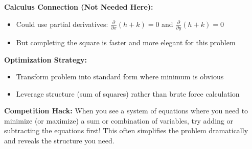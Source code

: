 \documentclass[12pt]{article}
\begin{document}
\begin{tacticalbox}
\textbf{Calculus Connection (Not Needed Here):}
\begin{itemize}
    \item Could use partial derivatives: $\frac{\partial}{\partial x}(h+k) = 0$ and $\frac{\partial}{\partial y}(h+k) = 0$
    \item But completing the square is faster and more elegant for this problem
\end{itemize}

\textbf{Optimization Strategy:}
\begin{itemize}
    \item Transform problem into standard form where minimum is obvious
    \item Leverage structure (sum of squares) rather than brute force calculation
\end{itemize}
\end{tacticalbox}

\vspace{1em}

\begin{protipbox}
\textbf{Competition Hack:} When you see a system of equations where you need to minimize (or maximize) a sum or combination of variables, try adding or subtracting the equations first! This often simplifies the problem dramatically and reveals the structure you need.
\end{protipbox}

\vspace{1em}
\end{document}
